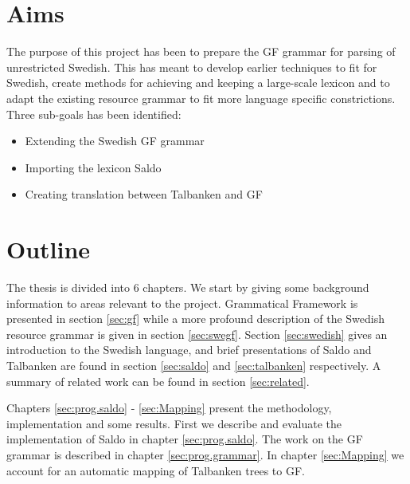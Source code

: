 \documentclass{report}
\begin{document}
\newpage %

\section{Aims}
The purpose of this project has been to prepare the GF grammar for parsing of 
unrestricted Swedish.
This has meant to develop earlier techniques to fit for Swedish, create methods
for achieving and keeping a large-scale lexicon and to adapt the existing
resource grammar to fit more language specific constrictions.
Three sub-goals has been identified:
\begin{itemize}
\item Extending the Swedish GF grammar
\item Importing the lexicon Saldo
\item Creating translation between Talbanken and GF
\end{itemize}

\section{Outline}
The thesis is divided into 6 chapters. We start by giving some background
information to areas relevant to the project. %
Grammatical Framework is presented in section \ref{sec:gf} while a more profound
description of the Swedish resource grammar is given in section \ref{sec:swegf}.
Section \ref{sec:swedish} gives an introduction to the Swedish language, and
brief presentations of Saldo and Talbanken are found in section \ref{sec:saldo} and
\ref{sec:talbanken} respectively.
A summary of related work can be found in section \ref{sec:related}.

Chapters \ref{sec:prog.saldo} - \ref{sec:Mapping} present the methodology,
implementation and some results. First we describe and evaluate the implementation
of Saldo in chapter \ref{sec:prog.saldo}. The work on the GF grammar is described in
chapter \ref{sec:prog.grammar}.
In chapter \ref{sec:Mapping} we account for an automatic mapping of Talbanken
trees to GF. %
\end{document}
